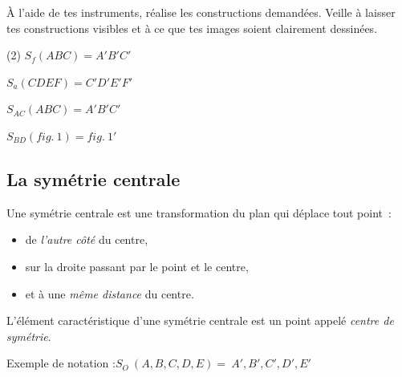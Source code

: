 \documentclass[../math2.tex]{subfiles}
\begin{document}
\begin{exercise}
    À l'aide de tes instruments, réalise les constructions demandées.
    Veille à laisser tes constructions visibles et à ce que tes images
    soient clairement dessinées.
    \begin{tasks}[after-item-skip=2cm](2)
        \task \(S_{f}(ABC)=A'B'C'\)
        \begin{center}
            \tikzspace
            
            \tikzspace
        \end{center}
        \task \(S_{a}(CDEF)=C'D'E'F'\)
        \begin{center}
            \tikzspace
            
            \tikzspace
        \end{center}
        \task \(S_{AC}(ABC)=A'B'C'\)
        \begin{center}
            \tikzspace
            
            \tikzspace
        \end{center}
        \task \(S_{BD}(fig.~1)=fig.~1'\)
        \begin{center}
            \tikzspace
            
            \tikzspace
        \end{center}
    \end{tasks}
\end{exercise}

\subsection{La symétrie centrale}
Une symétrie centrale est une transformation du plan qui déplace tout
point~:
\begin{itemize}[label=]
    \item de \emph{l'autre côté} du centre,
    \item sur la droite passant par le point et le centre,
    \item et à une \emph{même distance} du centre.
\end{itemize}

L'élément caractéristique d'une symétrie centrale est un point appelé
\emph{centre de symétrie}.

Exemple de notation :\(S_{O}\ (A,B,C,D,E) = \ A',B',C',D',E'\)
\end{document}
